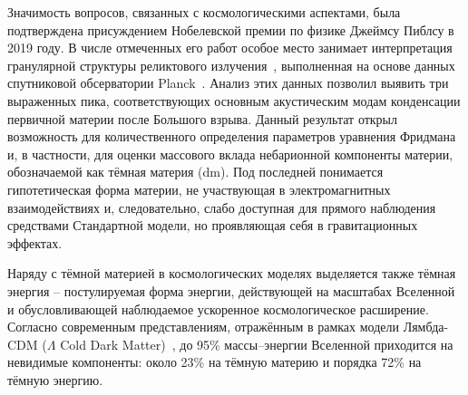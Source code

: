 Значимость вопросов, связанных с космологическими аспектами, была
подтверждена присуждением Нобелевской премии по физике Джеймсу
Пиблсу в 2019 году. В числе отмеченных его работ особое место
занимает интерпретация гранулярной структуры
реликтового излучения~\cite{peebles.fluctuations}, выполненная
на основе данных спутниковой обсерватории Planck~\cite{planck.2018.results}.
Анализ этих данных позволил выявить три выраженных пика,
соответствующих основным акустическим модам конденсации первичной
материи после Большого взрыва. Данный результат открыл возможность
для количественного определения параметров уравнения Фридмана и,
в частности, для оценки массового вклада небарионной компоненты
материи, обозначаемой как тёмная материя (\acrshort{dm}). Под последней понимается
гипотетическая форма материи, не участвующая в электромагнитных
взаимодействиях и, следовательно, слабо доступная для прямого наблюдения
средствами Стандартной модели, но проявляющая себя в
гравитационных эффектах.

Наряду с тёмной материей в космологических моделях выделяется
также тёмная энергия -- постулируемая форма энергии, действующей
на масштабах Вселенной и обусловливающей наблюдаемое ускоренное
космологическое расширение. Согласно современным представлениям,
отражённым в рамках модели Лямбда-CDM ($\Lambda$ Cold Dark
Matter)~\cite{lambda-cdm}, до 95\%
массы–энергии Вселенной приходится на невидимые компоненты:
около 23\% на тёмную материю и порядка 72\% на тёмную энергию.

